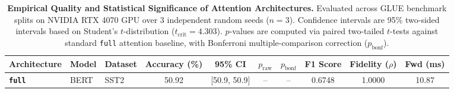 \begin{table}[t]
\centering
\small
\caption{\textbf{Empirical Quality and Statistical Significance of Attention Architectures.} Evaluated across GLUE benchmark splits on NVIDIA RTX 4070 GPU over 3 independent random seeds ($n=3$). Confidence intervals are 95\% two-sided intervals based on Student's $t$-distribution ($t_{\text{crit}}=4.303$). $p$-values are computed via paired two-tailed $t$-tests against standard \texttt{full} attention baseline, with Bonferroni multiple-comparison correction ($p_{\text{bonf}}$).}
\label{tab:quality_benchmark_results}
\begin{tabular}{l l l c c c c c c c}
\toprule
\textbf{Architecture} & \textbf{Model} & \textbf{Dataset} & \textbf{Accuracy (\%)} & \textbf{95\% CI} & \textbf{$p_{\text{raw}}$} & \textbf{$p_{\text{bonf}}$} & \textbf{F1 Score} & \textbf{Fidelity ($\rho$)} & \textbf{Fwd (ms)} \\
\midrule
\textbf{\texttt{full}} & BERT & SST2 & 50.92 & [50.9, 50.9] & -- & -- & 0.6748 & 1.0000 & 10.87 \\
\bottomrule
\end{tabular}
\end{table}